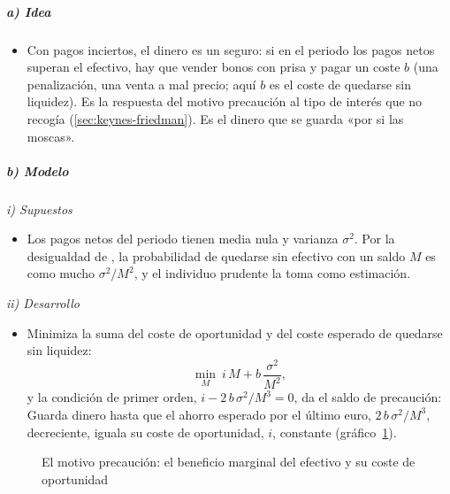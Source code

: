 \documentclass[11pt]{article}
\begin{document}
\subparagraph{a) Idea}

\begin{itemize}
\item Con pagos inciertos, el dinero es un seguro: si en el periodo los pagos netos superan el efectivo, hay que vender bonos con prisa y pagar un coste $b$ (una penalización, una venta a mal precio; aquí $b$ es el coste de quedarse sin liquidez)\nocite{Whalen1966Rationalization}. Es la respuesta del motivo precaución al tipo de interés que  no recogía (\ref{sec:keynes-friedman}). Es el dinero que se guarda «por si las moscas».
\end{itemize}

\subparagraph{b) Modelo}

\hspace*{3.6em}\emph{i) Supuestos}

\begin{itemize}
\item Los pagos netos del periodo tienen media nula y varianza $\sigma^2$. Por la desigualdad de , la probabilidad de quedarse sin efectivo con un saldo $M$ es como mucho $\sigma^2/M^2$, y el individuo prudente la toma como estimación.
\end{itemize}

\hspace*{3.6em}\emph{ii) Desarrollo}

\begin{itemize}
\item Minimiza la suma del coste de oportunidad y del coste esperado de quedarse sin liquidez:
  $$\min_{M}\ i\,M+b\,\frac{\sigma^2}{M^2},$$
  y la condición de primer orden, $i-2\,b\,\sigma^2/M^3=0$, da el saldo de precaución:
  Guarda dinero hasta que el ahorro esperado por el último euro, $2\,b\,\sigma^2/M^3$, decreciente, iguala su coste de oportunidad, $i$, constante (gráfico~\ref{fig:whalen}).
\end{itemize}

\begin{figure}[H]
\centering
\caption{El motivo precaución: el beneficio marginal del efectivo y su coste de oportunidad}\label{fig:whalen}
\end{figure}
\end{document}
